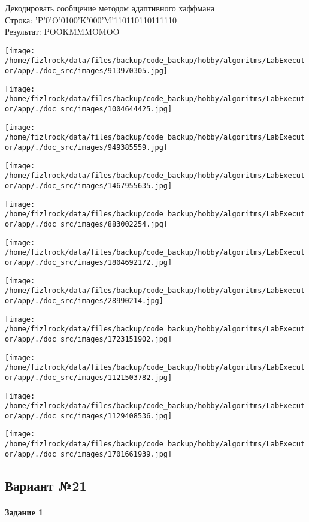 \documentclass[a4paper, 12pt]{article}
\begin{document}
Декодировать сообщение методом адаптивного хаффмана \\
Строка: 
'P'0'O'0100'K'000'M'110110110111110\\
Результат: POOKMMMOMOO

\texttt{[image: /home/fizlrock/data/files/backup/code\_backup/hobby/algoritms/LabExecutor/app/./doc\_src/images/913970305.jpg]}

\texttt{[image: /home/fizlrock/data/files/backup/code\_backup/hobby/algoritms/LabExecutor/app/./doc\_src/images/1004644425.jpg]}

\texttt{[image: /home/fizlrock/data/files/backup/code\_backup/hobby/algoritms/LabExecutor/app/./doc\_src/images/949385559.jpg]}

\texttt{[image: /home/fizlrock/data/files/backup/code\_backup/hobby/algoritms/LabExecutor/app/./doc\_src/images/1467955635.jpg]}

\texttt{[image: /home/fizlrock/data/files/backup/code\_backup/hobby/algoritms/LabExecutor/app/./doc\_src/images/883002254.jpg]}

\texttt{[image: /home/fizlrock/data/files/backup/code\_backup/hobby/algoritms/LabExecutor/app/./doc\_src/images/1804692172.jpg]}

\texttt{[image: /home/fizlrock/data/files/backup/code\_backup/hobby/algoritms/LabExecutor/app/./doc\_src/images/28990214.jpg]}

\texttt{[image: /home/fizlrock/data/files/backup/code\_backup/hobby/algoritms/LabExecutor/app/./doc\_src/images/1723151902.jpg]}

\texttt{[image: /home/fizlrock/data/files/backup/code\_backup/hobby/algoritms/LabExecutor/app/./doc\_src/images/1121503782.jpg]}

\texttt{[image: /home/fizlrock/data/files/backup/code\_backup/hobby/algoritms/LabExecutor/app/./doc\_src/images/1129408536.jpg]}

\texttt{[image: /home/fizlrock/data/files/backup/code\_backup/hobby/algoritms/LabExecutor/app/./doc\_src/images/1701661939.jpg]}
\pagebreak
\subsection{Вариант №21}
\paragraph{Задание 1}
\end{document}
